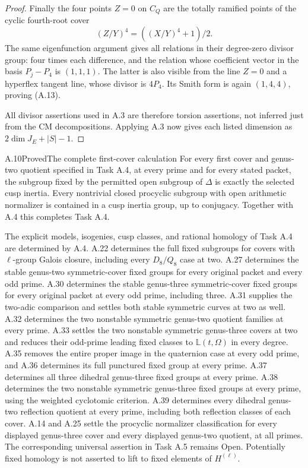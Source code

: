 \begin{proof}
Finally the four points $Z=0$ on $C_Q$ are the totally ramified
points of the cyclic fourth-root cover
\[
 (Z/Y)^4=((X/Y)^4+1)/2.
\]
The same eigenfunction argument gives all relations in their
degree-zero divisor group: four times each difference, and the
relation whose coefficient vector in the basis $P_j-P_4$ is
$(1,1,1)$. The latter is also visible from the line $Z=0$ and a
hyperflex tangent line, whose divisor is $4P_4$. Its Smith form
is again $(1,4,4)$, proving (A.13).

All divisor assertions used in A.3 are therefore torsion assertions,
not inferred just from the CM decompositions. Applying A.3 now
gives each listed dimension as $2\dim J_E+|S|-1$.
\end{proof}

\begin{statement}{A.10}{Proved}{The complete first-cover calculation}
For every first cover and genus-two quotient specified in Task A.4,
at every prime and for every stated packet, the subgroup fixed by
the permitted open subgroup of $\Delta$ is exactly the selected
cusp inertia. Every nontrivial closed procyclic subgroup with
open arithmetic normalizer is contained in a cusp inertia group,
up to conjugacy. Together with A.4 this completes Task A.4.

The explicit models, isogenies, cusp classes, and rational homology
of Task A.4 are determined by A.4. A.22 determines the full fixed subgroups for covers with
$\ell$-group Galois closure, including every $D_8/Q_8$ case at
two. A.27 determines the stable genus-two symmetric-cover fixed groups
for every original packet and every odd prime. A.30 determines the
stable genus-three symmetric-cover fixed groups for every original
packet at every odd prime, including three. A.31 supplies the
two-adic comparison and settles both stable symmetric curves at
two as well. A.32 determines the two nonstable symmetric
genus-two quotient families at every prime.
A.33 settles the two nonstable symmetric genus-three covers at two
and reduces their odd-prime leading fixed classes to
$\mathbb L(t,\Omega)$ in every degree.
A.35 removes the entire proper image in the quaternion case at every odd
prime, and A.36 determines its full punctured fixed group at every prime.
A.37 determines all three dihedral genus-three fixed groups at every prime.
A.38 determines the two nonstable symmetric genus-three fixed groups
at every prime, using the weighted cyclotomic criterion.
A.39 determines every dihedral genus-two reflection quotient at
every prime, including both reflection classes of each cover.
A.14 and A.25 settle the procyclic normalizer classification for every
displayed genus-three cover and every displayed genus-two quotient,
at all primes. The corresponding universal assertion in Task A.5
remains Open. Potentially fixed homology is not asserted to lift to
fixed elements of $H^{(\ell)}$.
\end{statement}

